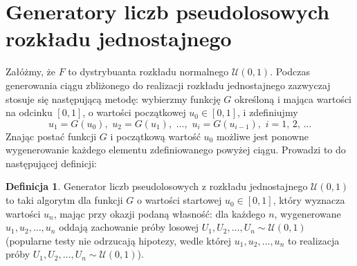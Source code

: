 \documentclass[inzynierska]{pwr_wmat_praca_dyplomowa}
\theoremstyle{plain}
\numberwithin{theorem}{chapter}
\theoremstyle{definition}
\numberwithin{theorem}{chapter}
\newtheorem{definition}[theorem]{Definicja}
\begin{document}
\section{Generatory liczb pseudolosowych rozkładu jednostajnego} %
Załóżmy, że $F$ to dystrybuanta rozkładu normalnego $\mathcal{U}(0,1)$. Podczas generowania ciągu zbliżonego do realizacji rozkładu jednostajnego zazwyczaj stosuje się następującą metodę: wybierzmy funkcję $G$ określoną i mająca wartości na odcinku $[0,1]$, o wartości początkowej $u_0 \in [0,1]$, i zdefiniujmy
\begin{equation}
	u_1=G(u_0), \,\, u_2=G(u_1), \,\, \dots, \,\,u_i=G(u_{i-1}), \,\, i=1,\,2,\,\dots 
\end{equation}
Znając postać funkcji $G$ i początkową wartość $u_0$ możliwe jest ponowne wygenerowanie każdego elementu zdefiniowanego powyżej ciągu. Prowadzi to do następującej definicji:
\begin{definition}
	Generator liczb pseudolosowych z rozkładu jednostajnego $\mathcal{U}(0,1)$ to taki algorytm dla funkcji $G$ o wartości startowej $u_0 \in [0,1]$, który wyznacza wartości $u_n$, mając przy okazji podaną własność: dla każdego $n$, wygenerowane $u_1,u_2,\dots,u_n$ oddają zachowanie próby losowej $U_1,U_2,\dots,U_n \sim \mathcal{U}(0,1)$ (popularne testy nie odrzucają hipotezy, wedle której $u_1,u_2,\dots,u_n$ to realizacja próby $U_1,U_2,\dots,U_n \sim \mathcal{U}(0,1)$).
\end{definition}
\end{document}
